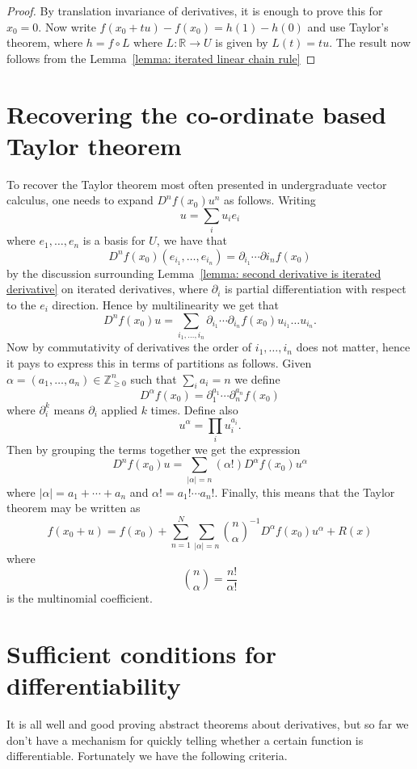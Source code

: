 \documentclass[twoside, a4paper, 10pt]{amsart}
\begin{document}
\begin{proof} By translation invariance of derivatives, it is enough to prove this for $x_0 = 0$. Now write $f(x_0 + tu) - f(x_0) = h(1) - h(0)$ and use Taylor's theorem, where $h = f \circ L$ where $L:\mathbb{R} \to U$ is given by $L(t) = tu$. The result now follows from the Lemma~\ref{lemma: iterated linear chain rule} 
\end{proof}

\section{Recovering the co-ordinate based Taylor theorem}

To recover the Taylor theorem most often presented in undergraduate vector calculus, one needs to expand $D^nf(x_0) u^n$ as follows. Writing $$u = \sum_i u_i e_i$$ where $e_1, \ldots, e_n$ is a basis for $U$, we have that $$D^nf(x_0) (e_{i_1}, \ldots, e_{i_n}) = \partial_{i_1} \cdots \partial{i_n}f(x_0)$$ by the discussion surrounding Lemma~\ref{lemma: second derivative is iterated derivative} on iterated derivatives, where $\partial_i$ is partial differentiation with respect to the $e_i$ direction. Hence by multilinearity we get that $$D^nf(x_0)u = \sum_{i_1, \ldots, i_n} \partial_{i_1} \cdots \partial_{i_n}f(x_0) u_{i_1} \ldots u_{i_n}.$$ Now by commutativity of derivatives the order of $i_1, \ldots, i_n$ does not matter, hence it pays to express this in terms of partitions as follows. Given $\alpha = (a_1, \ldots, a_n) \in \mathbb{Z}_{\geq 0}^n$ such that $\sum_i a_i = n$ we define $$D^{\alpha}f(x_0) = \partial_1^{a_1} \cdots \partial_n^{a_n} f(x_0)$$ where $\partial_i^{k}$ means $\partial_i$ applied $k$ times. Define also $$u^{\alpha} = \prod_{i} u_i^{a_i}.$$ Then by grouping the terms together we get the expression $$D^n f(x_0) u = \sum_{|\alpha| = n} (\alpha!) D^{\alpha}f(x_0) u ^{\alpha}$$ where $|\alpha| = a_1 + \cdots + a_n$ and $\alpha! = a_1! \cdots a_n!$. Finally, this means that the Taylor theorem may be written as $$ f(x_0 + u ) = f(x_0) + \sum_{n=1}^N \sum_{|\alpha| = n} \binom{n}{\alpha}^{-1} D^{\alpha}f(x_0) u^{\alpha}  + R(x) $$ where $$ \binom{n}{\alpha} = \frac{n!}{\alpha!} $$ is the multinomial coefficient.

\section{Sufficient conditions for differentiability}

It is all well and good proving abstract theorems about derivatives, but so far we don't have a mechanism for quickly telling whether a certain function is differentiable. Fortunately we have the following criteria. 
\end{document}
